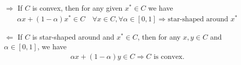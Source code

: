 \documentclass[11pt,a4paper]{ctexart}
\numberwithin{equation}{section}%
\begin{document}
\begin{itemize}[topsep=2pt,itemsep=0pt]
    \item[$  \Rightarrow  $] If $ C $ is convex, then for any given $ x^*\in C $ we have
    \begin{align*}
        \alpha x + (1-\alpha)x^*\in C \quad \forall x\in C, \forall \alpha \in [0,1]  \Rightarrow \text{star-shaped around }x^* 
    \end{align*}
    \item[$  \Leftarrow  $] If $ C $ is star-shaped around and $ x^*\in C $, then for any $ x,y\in C $ and $ \alpha \in [0,1] $, we have
    \begin{align*}
        \alpha x + (1-\alpha)y\in C \Rightarrow C \text{ is convex.} 
    \end{align*}
    
    
\end{itemize}
    
    
\end{document}
